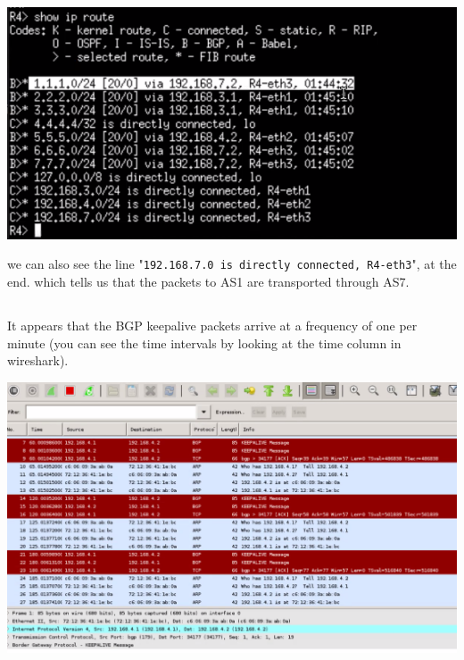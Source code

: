 \subsection{}
\begin{center}
    \includegraphics[width=1.2 \textwidth]{resources/q4-4.png}\centering
\end{center}
we can also see the line "\texttt{192.168.7.0 is directly connected, R4-eth3}", at the end.
which tells us that the packets to AS1 are transported through AS7.


\subsection{}
It appears that the BGP keepalive packets arrive at a frequency of one per minute (you can see the
time intervals by looking at the time column in wireshark).
\begin{center}
    \includegraphics[width=1.2 \textwidth]{resources/q4-5.png}\centering
\end{center}

